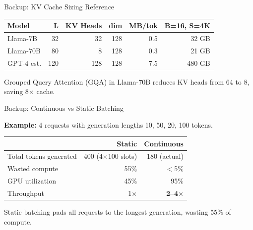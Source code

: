 \documentclass[aspectratio=169, 12pt]{beamer}
\begin{document}
\begin{frame}{Backup: KV Cache Sizing Reference}

\footnotesize
\renewcommand{\arraystretch}{1.15}
\begin{tabular}{@{}lrrrrr@{}}
  \toprule
  \textbf{Model} & \textbf{L} & \textbf{KV Heads} & \textbf{dim} & \textbf{MB/tok} & \textbf{B=16, S=4K} \\
  \midrule
  Llama-7B   & 32  & 32  & 128 & 0.5  & 32 GB \\
  Llama-70B  & 80  & 8   & 128 & 0.3  & 21 GB \\
  GPT-4 est. & 120 & 128 & 128 & 7.5  & 480 GB \\
  \bottomrule
\end{tabular}

\vspace{0.1cm}
{\footnotesize Grouped Query Attention (GQA) in Llama-70B reduces KV heads from 64 to 8, saving 8$\times$ cache.}

\end{frame}

\begin{frame}{Backup: Continuous vs Static Batching}
\note{
}

\footnotesize
\textbf{Example:} 4 requests with generation lengths 10, 50, 20, 100 tokens.

\vspace{0.1cm}
\renewcommand{\arraystretch}{1.15}
\begin{tabular}{@{}lrr@{}}
  \toprule
  & \textbf{Static} & \textbf{Continuous} \\
  \midrule
  Total tokens generated & 400 (4$\times$100 slots) & 180 (actual) \\
  Wasted compute & 55\% & $<$5\% \\
  GPU utilization & 45\% & 95\% \\
  Throughput & 1$\times$ & \textbf{2--4$\times$} \\
  \bottomrule
\end{tabular}

\vspace{0.1cm}
{\footnotesize Static batching pads all requests to the longest generation, wasting 55\% of compute.}

\end{frame}
\end{document}
